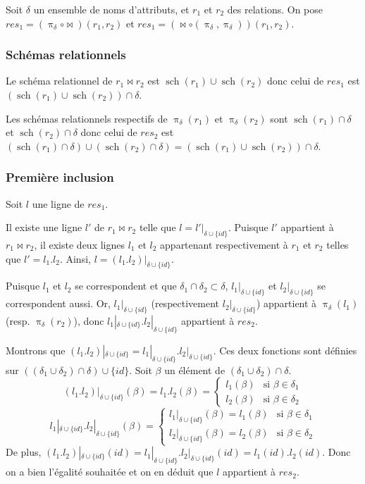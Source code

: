 \documentclass[french]{article}
\DeclareMathOperator{\proj}{\pi}
\DeclareMathOperator{\s}{sch}
\newcommand{\projDelta}{\proj_{\delta}}
\newcommand{\cip}{\cup \{id\}}
\newcommand{\dilta}{{\delta \cip}}
\begin{document}
Soit $\delta$ un ensemble de noms d'attributs,
et $r_1$ et $r_2$ des relations.
On pose $res_1 = (\projDelta \circ \Join)(r_1, r_2)$
et $res_1 = (\Join \circ (\projDelta, \projDelta))(r_1, r_2)$.

\subsubsection*{Schémas relationnels}
Le schéma relationnel de $r_1 \Join r_2$ est
$\s(r_1) \cup \s(r_2)$ donc celui de $res_1$
est $(\s(r_1) \cup \s(r_2)) \cap \delta$.

Les schémas relationnels respectifs de 
$\projDelta(r_1)$ et $\projDelta(r_2)$
sont $\s(r_1) \cap \delta$ et $\s(r_2)\cap \delta$
donc celui de $res_2$ est 
$(\s(r_1)\cap \delta) \cup (\s(r_2)\cap\delta) = (\s(r_1)\cup\s(r_2)) \cap \delta$.

\subsubsection*{Première inclusion}
Soit $l$ une ligne de $res_1$.

Il existe une ligne $l'$ de $r_1 \Join r_2$
telle que $l = l'|_\dilta$.
Puisque $l'$ appartient à $r_1 \Join r_2$,
il existe deux lignes $l_1$ et $l_2$ appartenant
respectivement à $r_1$ et $r_2$ telles que
$l' = l_1.l_2$.
Ainsi, $l = (l_1.l_2)|_\dilta$.

Puisque $l_1$ et $l_2$ se correspondent
et que $\delta_1 \cap \delta_2 \subset \delta$,
$l_1|_\dilta$ et $l_2|_\dilta$ se correspondent aussi.
Or, $l_1|_\dilta$ (respectivement $l_2|_\dilta$)
appartient à $\projDelta(l_1)$ (resp. $\projDelta(r_2)$),
donc $l_1|_\dilta . l_2|_\dilta$ appartient
à $res_2$.

Montrons que $(l_1.l_2)|_\dilta = l_1|_\dilta . l_2|_\dilta$.
Ces deux fonctions sont définies sur $((\delta_1 \cup \delta_2) \cap \delta) \cip$.
Soit $\beta$ un élément de $(\delta_1 \cup \delta_2) \cap \delta$.
$$
(l_1.l_2)|_\dilta(\beta) = l_1.l_2(\beta) =
\left\lbrace
\begin{array}{ll}
l_1(\beta) & \text{si $\beta \in \delta_1$} \\
l_2(\beta) & \text{si $\beta \in \delta_2$}
\end{array}
\right.
$$
$$
l_1|_\dilta . l_2|_\dilta (\beta) = 
\left\lbrace
\begin{array}{ll}
l_1|_\dilta (\beta) = l_1(\beta) & \text{si $\beta \in \delta_1$} \\
l_2|_\dilta (\beta) = l_2(\beta) & \text{si $\beta \in \delta_2$}
\end{array}
\right.
$$
De plus, $(l_1.l_2)|_\dilta(id) = l_1|_\dilta . l_2|_\dilta (id) = l_1(id) . l_2(id)$.
Donc on a bien l'égalité souhaitée et on en déduit que $l$ appartient à $res_2$.
\end{document}
